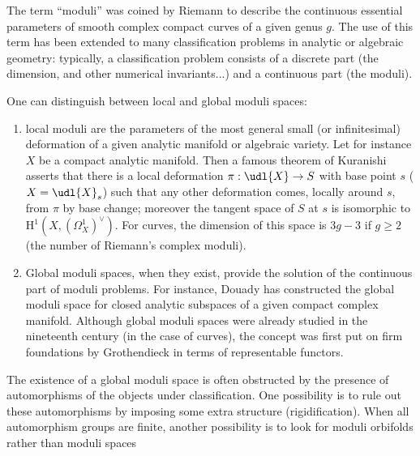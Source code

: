 \begin{para}\label{para:1.1.1} The term ``moduli'' was
 coined by Riemann to describe the continuous essential
 parameters of smooth complex compact curves of a given genus $g$. The use
 of this term has been extended to many classification problems in 
 analytic or algebraic
 geometry: typically, a classification problem consists of a discrete 
 part (the dimension, and other
 numerical invariants...) and a continuous part (the moduli). 

 One can distinguish between local and global moduli spaces: 

\begin{enumerate}
 \item local moduli are the parameters of the most general small (or
       infinitesimal) deformation of a given analytic manifold or
       algebraic variety. Let for instance $X$ be a compact analytic
       manifold.  Then a famous theorem of Kuranishi asserts that there
       is a local deformation $\pi: \udl{X}\rightarrow S$ with base
       point $s$ ($X={\udl{X}}_s$) such that any other deformation
       comes, locally around $s$, from $\pi$ by base change; moreover
       the tangent space of $S$ at $s$ is isomorphic to
       $\mathrm{H}^1(X,(\Omega^1_X)^\vee)$. For curves, the dimension of
       this space is $3g-3$ if $g\geq 2$ (the number of Riemann's
       complex moduli).
 \item Global moduli spaces, when they exist, provide the
       solution of the continuous part of moduli problems. For instance,
       Douady has constructed the global moduli space for closed analytic
       subspaces of a given compact complex manifold. Although global moduli
       spaces were already studied in the nineteenth century (in the case of
       curves), the concept was first put on firm foundations by Grothendieck
       in terms of representable functors.
\end{enumerate}

The existence of a global moduli space is often obstructed by the
presence of automorphisms of the objects under classification. One
possibility is to rule out these automorphisms by imposing some extra
structure (rigidification). When all automorphism groups are finite,
another possibility is to look for moduli orbifolds rather than moduli
spaces
\end{para}

